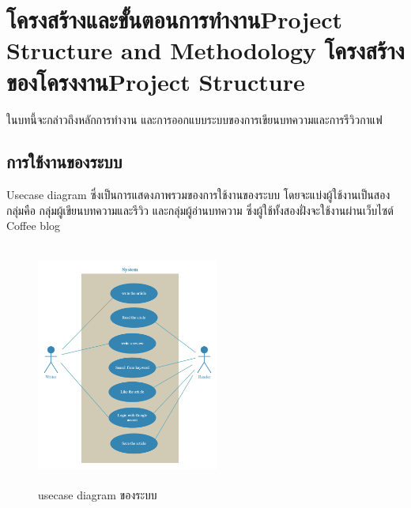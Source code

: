 \chapter{\ifproject%
\ifcpe โครงสร้างและขั้นตอนการทำงาน\else Project Structure and Methodology\fi
\else%
\ifcpe โครงสร้างของโครงงาน\else Project Structure\fi
\fi
}

ในบทนี้จะกล่าวถึงหลักการทำงาน และการออกแบบระบบของการเขียนบทความและการรีวิวกาแฟ

\makeatletter


\makeatother

\section{การใช้งานของระบบ}
Usecase diagram ซึ่งเป็นการแสดงภาพรวมของการใช้งานของระบบ โดยจะแบ่งผู้ใช้งานเป็นสองกลุ่มคือ กลุ่มผู้เขียนบทความและรีวิว และกลุ่มผู้อ่านบทความ ซึ่งผู้ใช้ทั้งสองฝั่งจะใช้งานผ่านเว็บไซต์ Coffee blog 

\begin{figure}[h]
\begin{center}
\includegraphics[width=6cm, height=8cm]{usecase-diagram.jpg}
\end{center}
\caption[Poem]{usecase diagram ของระบบ}
\end{figure}

